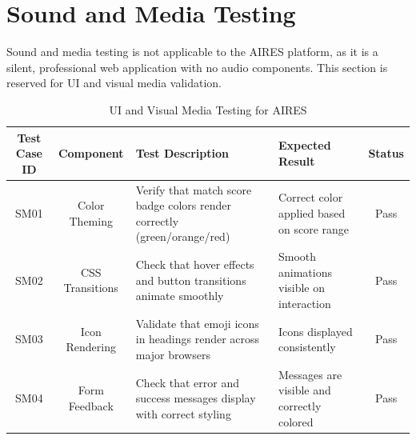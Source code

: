 \section{Sound and Media Testing}
Sound and media testing is not applicable to the AIRES platform, as it is a silent, professional web application with no audio components. This section is reserved for UI and visual media validation.
\begin{table}[H]
    \centering
    \renewcommand{\arraystretch}{1.3}
    \small
    \begin{tabular}{|c|c|p{3cm}|p{3cm}|c|}
        \hline
        \textbf{Test Case ID} & \textbf{Component} & \textbf{Test Description} & \textbf{Expected Result} & \textbf{Status} \\
        \hline
        SM01 & Color Theming & \raggedright Verify that match score badge colors render correctly (green/orange/red) & \raggedright Correct color applied based on score range & Pass \\
        \hline
        SM02 & CSS Transitions & \raggedright Check that hover effects and button transitions animate smoothly & \raggedright Smooth animations visible on interaction & Pass \\
        \hline
        SM03 & Icon Rendering & \raggedright Validate that emoji icons in headings render across major browsers & \raggedright Icons displayed consistently & Pass \\
        \hline
        SM04 & Form Feedback & \raggedright Check that error and success messages display with correct styling & \raggedright Messages are visible and correctly colored & Pass \\
        \hline
    \end{tabular}
    \caption{UI and Visual Media Testing for AIRES}
    \label{tab:sound_media_tests}
\end{table}

\newpage
